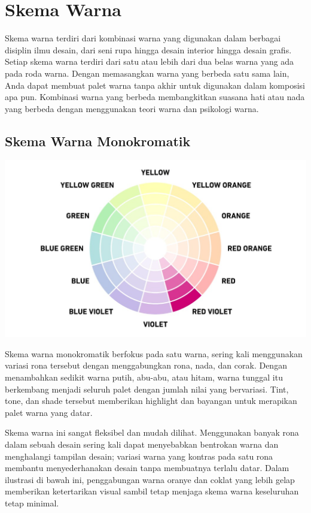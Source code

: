 \documentclass[a4paper]{article}
\begin{document}
\newpage

\section{Skema Warna}
Skema warna terdiri dari kombinasi warna yang digunakan dalam berbagai disiplin ilmu desain, dari seni rupa hingga desain interior hingga desain grafis. Setiap skema warna terdiri dari satu atau lebih dari dua belas warna yang ada pada roda warna. Dengan memasangkan warna yang berbeda satu sama lain, Anda dapat membuat palet warna tanpa akhir untuk digunakan dalam komposisi apa pun. Kombinasi warna yang berbeda membangkitkan suasana hati atau nada yang berbeda dengan menggunakan teori warna dan psikologi warna.

\subsection{Skema Warna Monokromatik}
\begin{center}
  \includegraphics[width=\widthtext]{resources/monochromatic.jpg}
\end{center}
Skema warna monokromatik berfokus pada satu warna, sering kali menggunakan variasi rona tersebut dengan menggabungkan rona, nada, dan corak. Dengan menambahkan sedikit warna putih, abu-abu, atau hitam, warna tunggal itu berkembang menjadi seluruh palet dengan jumlah nilai yang bervariasi. Tint, tone, dan shade tersebut memberikan highlight dan bayangan untuk merapikan palet warna yang datar.

Skema warna ini sangat fleksibel dan mudah dilihat. Menggunakan banyak rona dalam sebuah desain sering kali dapat menyebabkan bentrokan warna dan menghalangi tampilan desain; variasi warna yang kontras pada satu rona membantu menyederhanakan desain tanpa membuatnya terlalu datar. Dalam ilustrasi di bawah ini, penggabungan warna oranye dan coklat yang lebih gelap memberikan ketertarikan visual sambil tetap menjaga skema warna keseluruhan tetap minimal.
\end{document}
